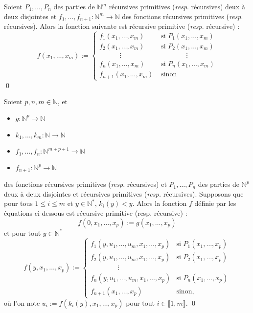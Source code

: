 \documentclass[./main]{subfiles}
\begin{document}
 \begin{lem}
   Soient $P_1, \ldots, P_n$ des parties de $\mathds{N}^m$ récursives primitives (\textit{resp}. récursives) deux à deux disjointes et $f_1, \ldots, f_{n+1} : \mathds{N}^m \to \mathds{N}$ des fonctions récursives primitives (\textit{resp}. récursives). Alors la fonction suivante est récursive primitive (\textit{resp}. récursive) :
   \[
   f(x_1, \ldots, x_m) := \begin{cases}
     f_1(x_1, \ldots, x_m) & \text{ si } P_1(x_1, \ldots, x_m)\\
     f_2(x_1, \ldots, x_m) & \text{ si } P_2(x_1, \ldots, x_m)\\
     \quad\quad\quad\vdots \quad & \quad\quad\quad\quad \vdots\\
     f_n(x_1, \ldots, x_m) & \text{ si } P_n(x_1, \ldots, x_m)\\
     f_{n+1}(x_1, \ldots, x_m) & \text{ sinon}
   \end{cases}
   \] \qed
 \end{lem}

 \begin{lem}
   Soient $p, n, m \in \mathds{N}$, et 
   \begin{itemize}
     \item $g : \mathds{N}^p \to \mathds{N}$
     \item $k_1, \ldots, k_m : \mathds{N} \to \mathds{N}$
     \item $f_1, \ldots, f_n : \mathds{N}^{m + p + 1} \to \mathds{N}$
     \item $f_{n+1} : \mathds{N}^p \to \mathds{N}$
   \end{itemize}
   des fonctions récursives primitives (\textit{resp}. récursives) et $P_1, \ldots, P_n$ des parties de $\mathds{N}^p$ deux à deux disjointes et récursives primitives (\textit{resp.} récursives). Supposons que pour tous $1 \le i \le m$ et $y \in \mathds{N}^*$, $k_i(y) < y$. Alors la fonction $f$ définie par les équations ci-dessous est récursive primitive (resp. récursive) :
   \[f(0, x_1, \ldots, x_p) := g(x_1, \ldots, x_p)\]
   et pour tout $y \in \mathds{N}^*$
    \[
   f(y, x_1, \ldots, x_p) := \begin{cases}
     f_1(y, u_1, \ldots, u_m, x_1, \ldots, x_p) & \text{si } P_1(x_1, \ldots, x_p)\\
     f_2(y, u_1, \ldots, u_m, x_1, \ldots, x_p) & \text{si } P_2(x_1, \ldots, x_p)\\
     \quad\quad\quad\quad \vdots\\
     f_n(y, u_1, \ldots, u_m, x_1, \ldots, x_p) & \text{si } P_n(x_1, \ldots, x_p)\\
     f_{n+1}(x_1, \ldots, x_p) & \text{sinon},
   \end{cases}
   \] 
   où l'on note $u_i := f(k_i(y), x_1, \ldots, x_p)$ pour tout  $i \in \llbracket 1, m\rrbracket$.
   \qed
 \end{lem}
\end{document}
